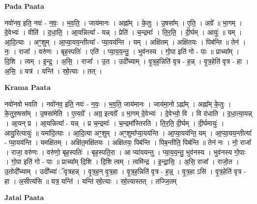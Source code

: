 \documentclass[17pt]{extarticle}
\begin{document}
\textbf{Pada Paata} \newline

नवो॑नव॒ इति॒ नवः॑ - न॒वः॒ । भ॒व॒ति॒ । जाय॑मानः । अह्ना᳚म् । के॒तुः । उ॒षसा᳚म् । ए॒ति॒ । अग्रे᳚ ॥ भा॒गम् । दे॒वेभ्यः॑ । वीति॑ । द॒धा॒ति॒ । आ॒यन्नित्या᳚ - यन्न् । प्रेति॑ । च॒न्द्रमाः᳚ । ति॒र॒ति॒ । दी॒र्घम् । आयुः॑ ॥ यम् । आ॒दि॒त्याः । अꣳ॒॒शुम् । आ॒प्या॒यय॒न्तीत्या᳚ - प्या॒यय॑न्ति । यम् । अक्षि॑तम् । अक्षि॑तयः । पिब॑न्ति ॥ तेन॑ । नः॒ । राजा᳚ । वरु॑णः । बृह॒स्पतिः॑ । एति॑ । प्या॒य॒य॒न्तु॒ । भुव॑नस्य । गो॒पा इति॑ गो - पाः ॥ प्राच्या᳚म् । दि॒शि । त्वम् । इ॒न्द्र॒ । अ॒सि॒ । राजा᳚ । उ॒त । उदी᳚च्याम् । वृ॒त्र॒ह॒न्निति॑ वृत्र - ह॒न्न् । वृ॒त्र॒हेति॑ वृत्र - हा । अ॒सि॒ ॥ यत्र॑ । यन्ति॑ । स्रो॒त्याः । तत् ।  \newline


\textbf{Krama Paata} \newline

नवो॑नवो भवति । नवो॑नव॒ इति॒ नवः॑ - न॒वः॒ । भ॒व॒ति॒ जाय॑मानः । जाय॑मा॒नो ऽह्ना᳚म् । अह्ना᳚म् के॒तुः । के॒तुरु॒षसा᳚म् । उ॒षसा॑मेति । ए॒त्यग्रे᳚ । अग्र॒ इत्यग्रे᳚ ॥ भा॒गम् दे॒वेभ्यः॑ । दे॒वेभ्यो॒ वि । वि द॑धाति । द॒धा॒त्या॒यन्न् । आ॒यन् प्र । आ॒यन्नित्या᳚ - यन्न् । प्र च॒न्द्रमाः᳚ । च॒न्द्रमा᳚स्तिरति । ति॒र॒ति॒ दी॒र्घम् । दी॒र्घमायुः॑ । आयु॒रित्यायुः॑ ॥ यमा॑दि॒त्याः । आ॒दि॒त्या अꣳ॒॒शुम् । अꣳ॒॒शुमा᳚प्या॒यय॑न्ति । आ॒प्या॒यय॑न्ति॒ यम् । आ॒प्या॒यय॒न्तीत्या᳚ - प्या॒यय॑न्ति । यमक्षि॑तम् । अक्षि॑त॒मक्षि॑तयः । अक्षि॑तयः॒ पिब॑न्ति । पिब॒न्तीति॒ पिब॑न्ति ॥ तेन॑ नः । नो॒ राजा᳚ । राजा॒ वरु॑णः । वरु॑णो॒ बृह॒स्पतिः॑ । बृह॒स्पति॒रा । आ प्या॑ययन्तु । प्या॒य॒य॒न्तु॒ भुव॑नस्य । भुव॑नस्य गो॒पाः । गो॒पा इति॑ गो - पाः ॥ प्राच्या᳚म् दि॒शि । दि॒शि त्वम् । त्वमि॑न्द्र । इ॒न्द्रा॒सि॒ । अ॒सि॒ राजा᳚ । राजो॒त । उ॒तोदी᳚च्याम् । उदी᳚च्यां ॅवृत्रहन्न् । वृ॒त्र॒ह॒न् वृ॒त्र॒हा । वृ॒त्र॒ह॒न्निति॑ वृत्र - ह॒न्न्॒ । वृ॒त्र॒हा ऽसि॑ । वृ॒त्र॒हेति॑ वृत्र - हा । अ॒सीत्य॑सि ॥ यत्र॒ यन्ति॑ । यन्ति॑ स्रो॒त्याः । स्रो॒त्यास्तत् । तज्जि॒तम् \newline

\textbf{Jatai Paata} \newline
\end{document}

